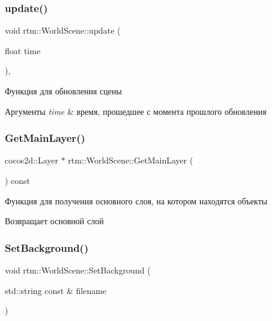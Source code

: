 \subsubsection{\texorpdfstring{update()}{update()}}
{\footnotesize\ttfamily void rtm\+::\+World\+Scene\+::update (\begin{DoxyParamCaption}\item[{float}]{time }\end{DoxyParamCaption})\hspace{0.3cm}{\ttfamily [override]}, {\ttfamily [virtual]}}



Функция для обновления сцены 


\begin{DoxyParams}{Аргументы}
{\em time} & время, прошедшее с момента прошлого обновления \\
\hline
\end{DoxyParams}
\mbox{\label{classrtm_1_1_world_scene_a33b06df7f231db363d6894408e16e225}} 
\subsubsection{\texorpdfstring{Get\+Main\+Layer()}{GetMainLayer()}}
{\footnotesize\ttfamily cocos2d\+::\+Layer $\ast$ rtm\+::\+World\+Scene\+::\+Get\+Main\+Layer (\begin{DoxyParamCaption}{ }\end{DoxyParamCaption}) const}



Функция для получения основного слоя, на котором находятся объекты 

\begin{DoxyReturn}{Возвращает}
основной слой 
\end{DoxyReturn}
\mbox{\label{classrtm_1_1_world_scene_accf4ad079366ad6ca9731bff83d937c0}} 
\subsubsection{\texorpdfstring{Set\+Background()}{SetBackground()}\hspace{0.1cm}{\footnotesize\ttfamily [1/2]}}
{\footnotesize\ttfamily void rtm\+::\+World\+Scene\+::\+Set\+Background (\begin{DoxyParamCaption}\item[{std\+::string const \&}]{filename }\end{DoxyParamCaption})}



